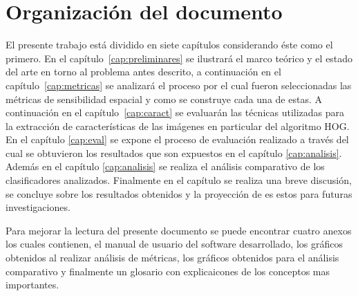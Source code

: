 \section{Organizaci\'on del documento}
\label{intro:organizacion}

El presente trabajo está dividido en siete capítulos considerando éste como el primero. En el capítulo~\ref{cap:preliminares} se ilustrará el marco teórico y el estado del arte en torno al problema antes descrito, a continuación en el capítulo~\ref{cap:metricas} se analizará el proceso por el cual fueron seleccionadas las métricas de sensibilidad espacial y como se construye cada una de estas. A continuación en el capítulo~\ref{cap:caract} se evaluarán las técnicas utilizadas para la extracción de características de las imágenes en particular del algoritmo HOG. En el capítulo \ref{cap:eval} se expone el proceso de evaluación realizado a través del  cual se obtuvieron los resultados que son expuestos en el capítulo \ref{cap:analisis}. Además en el capítulo \ref{cap:analisis} se realiza el análisis comparativo de los clasificadores analizados. Finalmente en el capítulo \label{cap:conclusiones} se realiza una breve discusión, se concluye sobre los resultados obtenidos y la proyección de es estos para futuras investigaciones.

Para mejorar la lectura del presente documento se puede encontrar cuatro anexos los cuales contienen, el manual de usuario del software desarrollado, los gráficos obtenidos al realizar análisis de métricas, los gráficos obtenidos para el análisis comparativo y finalmente un glosario con explicaicones de los conceptos mas importantes.
